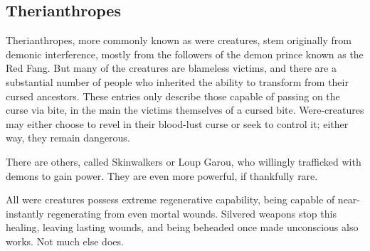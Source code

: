 \subsection{Therianthropes}
Therianthropes, more commonly known as were creatures, stem originally from demonic interference, mostly from the followers of the demon prince known as the Red Fang. But many of the creatures are blameless victims, and there are a substantial number of people who inherited the ability to transform from their cursed ancestors. These entries only describe those capable of passing on the curse via bite, in the main the victims themselves of a cursed bite. Were-creatures may either choose to revel in their blood-lust curse or seek to control it; either way, they remain dangerous.

There are others, called Skinwalkers or Loup Garou, who willingly trafficked with demons to gain power. They are even more powerful, if thankfully rare.

All were creatures possess extreme regenerative capability, being capable of near-instantly regenerating from even mortal wounds. Silvered weapons stop this healing, leaving lasting wounds, and being beheaded once made unconscious also works. Not much else does.

